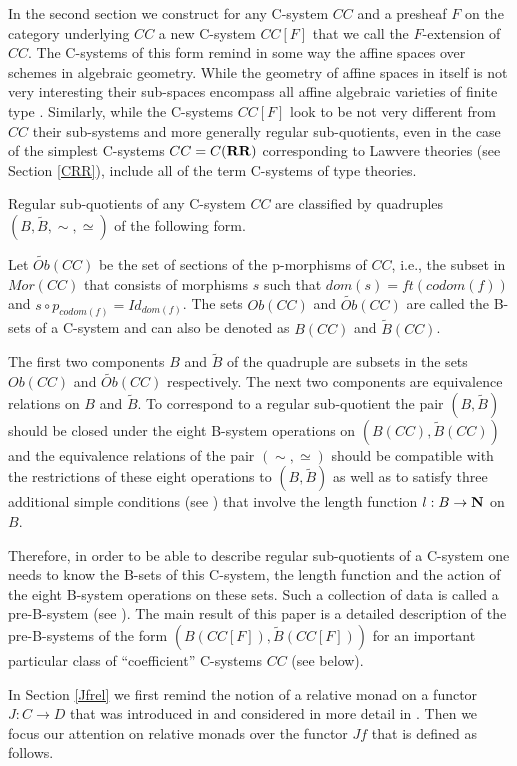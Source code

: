 \documentclass[12pt]{amsart}
\newcommand{\sr}{\rightarrow}
\newcommand{\nn}{{\bf N\rm}}
\newcommand{\nat}{\nn}
\newcommand{\wt}{\widetilde}
\newcommand{\RR}{{\bf RR}}
\begin{document}
In the second section we construct for any C-system $CC$ and a presheaf $F$ on the category underlying $CC$ a new C-system $CC[F]$ that we call the $F$-extension of $CC$. The C-systems of this form remind in some way the affine spaces over schemes in algebraic geometry. While the geometry of affine spaces in itself is not very interesting their sub-spaces encompass all affine algebraic varieties of finite type . Similarly, while the C-systems $CC[F]$ look to be not very different from $CC$ their sub-systems and more generally regular sub-quotients, even in the case of the simplest C-systems $CC=C(\RR)$ corresponding to Lawvere theories (see Section \ref{CRR}), include all of the term C-systems of type theories.  

Regular sub-quotients of any C-system $CC$ are classified by quadruples $(B,\wt{B}, \sim,\simeq)$ of the following form. 

Let $\wt{Ob}(CC)$ be the set of sections of the p-morphisms of $CC$, i.e., the subset in $Mor(CC)$ that consists of morphisms $s$ such that $dom(s)=ft(codom(f))$ and $s\circ p_{codom(f)}=Id_{dom(f)}$.  The sets $Ob(CC)$ and $\wt{Ob}(CC)$ are called the B-sets of a C-system and can also be denoted as $B(CC)$ and $\wt{B}(CC)$. 

The first two components $B$ and $\wt{B}$ of the quadruple are subsets in the sets $Ob(CC)$ and $\wt{Ob}(CC)$ respectively. The next two components are equivalence relations on $B$ and $\wt{B}$. To correspond to a regular sub-quotient the pair $(B,\wt{B})$ should be closed under the eight B-system operations on $(B(CC),\wt{B}(CC))$ and the equivalence relations of the pair $(\sim,\simeq)$ should be compatible with the restrictions of these eight operations to $(B,\wt{B})$ as well as to satisfy three additional simple conditions (see \cite[Proposition 5.4]{Csubsystems}) that involve the length function $l:B\sr\nat$ on $B$. 

Therefore, in order to be able to describe regular sub-quotients of a C-system one needs to know the B-sets of this C-system, the length function and the action of 
the eight B-system operations on these sets. Such a collection of data is called a pre-B-system (see \cite{Bsystems}). The main result of this paper is a detailed description of the pre-B-systems of the form $(B(CC[F]),\wt{B}(CC[F]))$ for an important particular class of ``coefficient'' C-systems $CC$ (see below). 

In Section \ref{Jfrel} we first remind the notion of a relative monad on a functor $J:C\sr D$ that was introduced in \cite[Def.1, p.299]{ACU} and considered in more detail in \cite{ACU2}. Then we focus our attention on relative monads over the functor $Jf$ that is defined as follows. 
\end{document}
